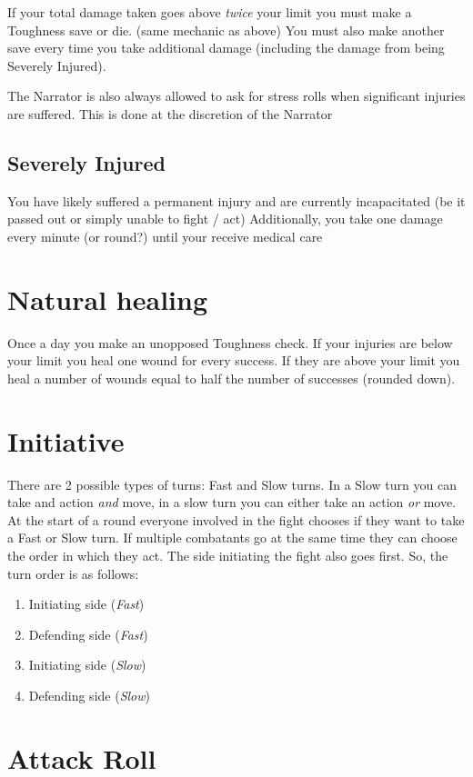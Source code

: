If your total damage taken goes above \textit{twice} your limit you must make a Toughness save or die. (same mechanic as above)  
You must also make another save every time you take additional damage (including the damage from being Severely Injured).

The Narrator is also always allowed to ask for stress rolls when significant injuries are suffered. This is done at the discretion of the Narrator


\subsection{Severely Injured}
You have likely suffered a permanent injury and are currently incapacitated (be it passed out or simply unable to fight / act)
Additionally, you take one damage every minute (or round?) until your receive medical care


\section{Natural healing}
Once a day you make an unopposed Toughness check. 
If your injuries are below your limit you heal one wound for every success. 
If they are above your limit you heal a number of wounds equal to half the number of successes (rounded down).

\section{Initiative}
There are 2 possible types of turns: Fast and Slow turns.  
In a Slow turn you can take and action \textit{and} move, in a slow turn you can either take an action \textit{or} move.  
At the start of a round everyone involved in the fight chooses if they want to take a Fast or Slow turn.
If multiple combatants go at the same time they can choose the order in which they act.
The side initiating the fight also goes first. So, the turn order is as follows: 

\begin{enumerate}
    \item Initiating side (\textit{Fast})
    \item Defending side (\textit{Fast})
    \item Initiating side (\textit{Slow})
    \item Defending side (\textit{Slow})
\end{enumerate}


\section{Attack Roll}

